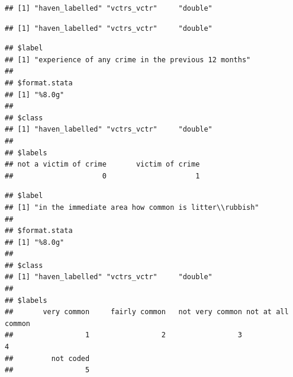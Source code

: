 \documentclass[
]{book}
\newenvironment{Shaded}{\begin{snugshade}}{\end{snugshade}}
\newcommand{\CommentTok}[1]{\textcolor[rgb]{0.56,0.35,0.01}{\textit{#1}}}
\newcommand{\FunctionTok}[1]{\textcolor[rgb]{0.00,0.00,0.00}{#1}}
\newcommand{\NormalTok}[1]{#1}
\newcommand{\SpecialCharTok}[1]{\textcolor[rgb]{0.00,0.00,0.00}{#1}}
\begin{document}
\begin{Shaded}
\end{Shaded}

\begin{verbatim}
## [1] "haven_labelled" "vctrs_vctr"     "double"
\end{verbatim}

\begin{Shaded}
\end{Shaded}

\begin{verbatim}
## [1] "haven_labelled" "vctrs_vctr"     "double"
\end{verbatim}

\begin{Shaded}
\end{Shaded}

\begin{verbatim}
## $label
## [1] "experience of any crime in the previous 12 months"
## 
## $format.stata
## [1] "%8.0g"
## 
## $class
## [1] "haven_labelled" "vctrs_vctr"     "double"        
## 
## $labels
## not a victim of crime       victim of crime 
##                     0                     1
\end{verbatim}

\begin{Shaded}
\end{Shaded}

\begin{verbatim}
## $label
## [1] "in the immediate area how common is litter\\rubbish"
## 
## $format.stata
## [1] "%8.0g"
## 
## $class
## [1] "haven_labelled" "vctrs_vctr"     "double"        
## 
## $labels
##       very common     fairly common   not very common not at all common 
##                 1                 2                 3                 4 
##         not coded 
##                 5
\end{verbatim}
\end{document}
